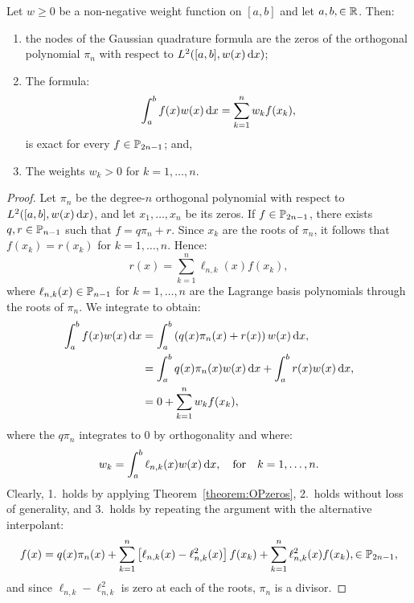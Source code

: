 \begin{theorem}\label{theorem:Gaussnodesandweights}
Let $w\ge0$ be a non-negative weight function on $[a,b]$ and let $a,b,\in\R$. Then:
\begin{enumerate}
\item the nodes of the Gaussian quadrature formula are the zeros of the orthogonal polynomial $\pi_n$ with respect to $L^2([a,b],w(x)\ud x)$;
\item The formula:
\[
\int_a^bf(x)w(x)\ud x = \sum_{k=1}^n w_kf(x_k),
\]
is exact for every $f\in\P_{2n-1}$; and,
\item The weights $w_k>0$ for $k=1,\ldots,n$.
\end{enumerate}
\end{theorem}
\begin{proof}
Let $\pi_n$ be the degree-$n$ orthogonal polynomial with respect to $L^2([a,b],w(x)\ud x)$, and let $x_1,\ldots,x_n$ be its zeros. If $f\in\P_{2n-1}$, there exists $q,r\in\P_{n-1}$ such that $f = q\pi_n + r$. Since $x_k$ are the roots of $\pi_n$, it follows that $f(x_k) = r(x_k)$ for $k=1,\ldots,n$. Hence:
\[
r(x) = \sum_{k=1}^n \ell_{n,k}(x) f(x_k),
\]
where $\ell_{n,k}(x)\in\P_{n-1}$ for $k=1,\ldots,n$ are the Lagrange basis polynomials through the roots of $\pi_n$. We integrate to obtain:
\begin{align*}
\int_a^b f(x)w(x)\ud x & = \int_a^b\left(q(x)\pi_n(x)+r(x)\right)w(x)\ud x,\\
& = \int_a^b q(x)\pi_n(x)w(x)\ud x + \int_a^br(x) w(x)\ud x,\\
& = 0 + \sum_{k=1}^nw_kf(x_k),
\end{align*}
where the $q\pi_n$ integrates to $0$ by orthogonality and where:
\[
w_k = \int_a^b \ell_{n,k}(x)w(x)\ud x,\quad{\rm for}\quad k=1,\ldots,n.
\]
Clearly, 1.~holds by applying Theorem~\ref{theorem:OPzeros}, 2.~holds without loss of generality, and 3.~holds by repeating the argument with the alternative interpolant:
\[
f(x) = q(x)\pi_n(x) + \sum_{k=1}^n\left[\ell_{n,k}(x)-\ell_{n,k}^2(x)\right]f(x_k) + \sum_{k=1}^n\ell_{n,k}^2(x)f(x_k),\in\P_{2n-1},
\]
and since $\ell_{n,k}-\ell_{n,k}^2$ is zero at each of the roots, $\pi_n$ is a divisor.
\end{proof}

